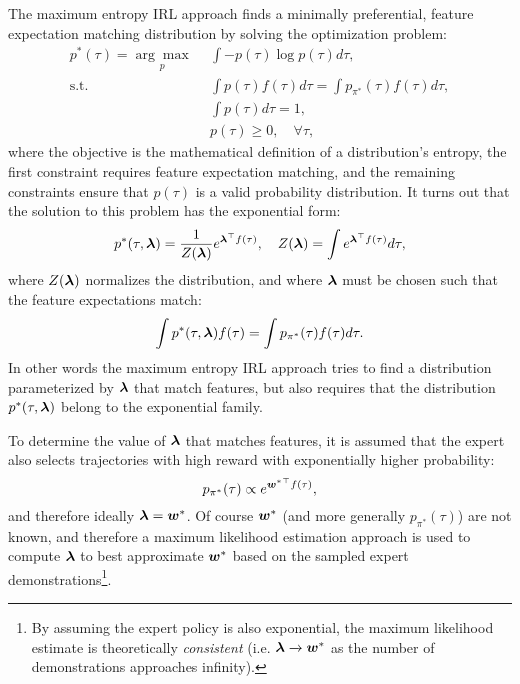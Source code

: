 The maximum entropy IRL approach finds a minimally preferential, feature expectation matching distribution by solving the optimization problem:
\begin{equation} \label{eq:maxentIRL}
\begin{split}
p^*(\tau) = \underset{p}{\arg\max} \:\: & \int -p(\tau) \log p(\tau) d\tau,\\
\text{s.t.} \:\:& \int p(\tau)f(\tau) d\tau = \int p_{\pi^*}(\tau)f(\tau) d\tau, \\
& \int p(\tau) d\tau = 1, \\
& p(\tau) \geq 0, \quad \forall \tau,
\end{split}
\end{equation}
where the objective is the mathematical definition of a distribution's entropy, the first constraint requires feature expectation matching, and the remaining constraints ensure that $p(\tau)$ is a valid probability distribution. It turns out that the solution to this problem has the exponential form:
\begin{equation*}
p^*(\tau, \bm{\lambda}) = \frac{1}{Z(\bm{\lambda})}e^{\bm{\lambda}^\top  f(\tau)}, \quad Z(\bm{\lambda}) = \int e^{\bm{\lambda}^\top  f(\tau)} d\tau,
\end{equation*}
where $Z(\bm{\lambda})$ normalizes the distribution, and where $\bm{\lambda}$ must be chosen such that the feature expectations match:
\begin{equation*}
\int p^*(\tau, \bm{\lambda})f(\tau) = \int  p_{\pi^*}(\tau)f(\tau) d\tau.
\end{equation*}
In other words the maximum entropy IRL approach tries to find a distribution parameterized by $\bm{\lambda}$ that match features, but also requires that the distribution $p^*(\tau, \bm{\lambda})$ belong to the exponential family.

To determine the value of $\bm{\lambda}$ that matches features, it is assumed that the expert also selects trajectories with high reward with exponentially higher probability:
\begin{equation*}
p_{\pi^*}(\tau) \propto e^{{\bm{w}^*}^\top  f(\tau)},
\end{equation*}
and therefore ideally $\bm{\lambda} = \bm{w}^*$.
Of course $\bm{w}^*$ (and more generally $p_{\pi^*}(\tau)$) are not known, and therefore a maximum likelihood estimation approach is used to compute $\bm{\lambda}$ to best approximate $\bm{w}^*$ based on the sampled expert demonstrations\footnote{By assuming the expert policy is also exponential, the maximum likelihood estimate is theoretically \textit{consistent} (i.e. $\bm{\lambda} \xrightarrow{} \bm{w}^*$ as the number of demonstrations approaches infinity).}.


